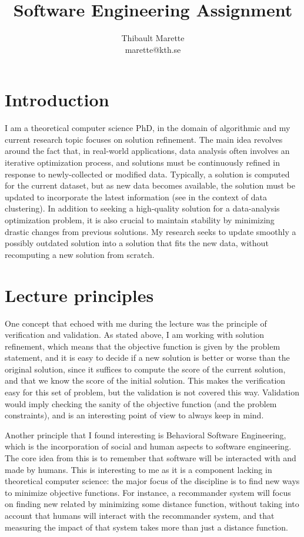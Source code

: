 \documentclass[11pt]{article}
\title{Software Engineering Assignment}
\author{Thibault Marette\\ marette@kth.se}
\date{}
\begin{document}
\maketitle
\section{Introduction}
I am a theoretical computer science PhD, in the domain of algorithmic and my current research topic focuses on solution refinement. The main idea revolves around the fact that, in real-world applications, data analysis often involves an iterative optimization process, and solutions must be continuously refined in response to newly-collected or modified data. Typically, a solution is computed for the current dataset, but as new data becomes available, the solution must be updated to incorporate the latest information (see \cite{ergun2021learning} in the context of data clustering). In addition to seeking a high-quality solution for a data-analysis optimization problem, it is also crucial to maintain stability by minimizing drastic changes from previous solutions. My research seeks to update smoothly a possibly outdated solution into a solution that fits the new data, without recomputing a new solution from scratch. 

\section{Lecture principles}
One concept that echoed with me during the lecture was the principle of verification and validation. As stated above, I am working with solution refinement, which means that the objective function is given by the problem statement, and it is easy to decide if a new solution is better or worse than the original solution, since it suffices to compute the score of the current solution, and that we know the score of the initial solution. This makes the verification easy for this set of problem, but the validation is not covered this way. Validation would imply checking the sanity of the objective function (and the problem constraints), and is an interesting point of view to always keep in mind.

\medskip

Another principle that I found interesting is Behavioral Software Engineering, which is the incorporation of social and human aspects to software engineering. The core idea from this is to remember that software will be interacted with and made by humans. This is interesting to me as it is a component lacking in theoretical computer science: the major focus of the discipline is to find new ways to minimize objective functions. For instance, a recommander system will focus on finding new related by minimizing some distance function, without taking into account that humans will interact with the recommander system, and that measuring the impact of that system takes more than just a distance function.
\end{document}
